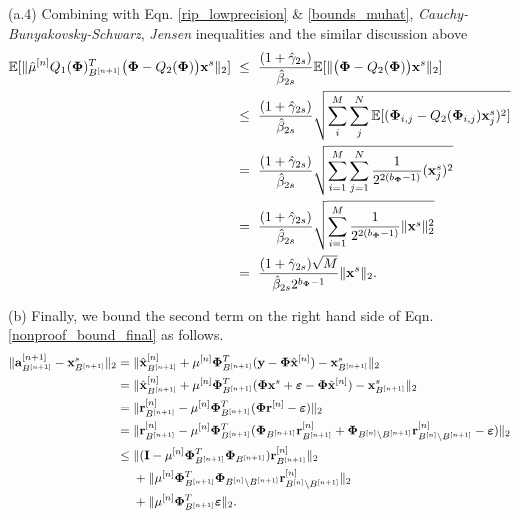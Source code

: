 \documentclass[aoas,preprint]{imsart}
\numberwithin{equation}{section}
\theoremstyle{plain}
\begin{document}
{(a.4) Combining with Eqn. \ref{rip_lowprecision} \& \ref{bounds_muhat}, {\it Cauchy-Bunyakovsky-Schwarz}, {\it Jensen} inequalities and the similar discussion above
\begin{equation}\label{forth_term_main_theorem}
\begin{split}
    \mathbb{E}[\| \hat{\mu}^{[n]}Q_1({\bf \Phi})_{B^{[n+1]}}^T\big({\bf {\bf \Phi}}-Q_2({\bf {\bf \Phi}})\big){\bf x}^s \|_2]&\ \leq \ \frac{(1+\hat{\gamma}_{2s})}{\hat{\beta}_{2s}}\mathbb{E}[\|\big({\bf {\bf \Phi}}-Q_2({\bf {\bf \Phi}})\big){\bf x}^s \|_2]\\
    &\ \leq \ \frac{(1+\hat{\gamma}_{2s})}{\hat{\beta}_{2s}}\sqrt{
    \sum_{i}^M \sum_{j}^N\mathbb{E}[({\bf \Phi}_{i, j}-Q_2({\bf \Phi}_{i, j}){\bf x}_j^s)^2]}\\
    & \ = \ \frac{(1+\hat{\gamma}_{2s})}{\hat{\beta}_{2s}}\sqrt{\sum_{i=1}^M \sum_{j=1}^N \frac{1}{2^{2(b_{\bf \Phi}-1)}}({\bf x}_j^s)^2}\\
    & \ = \ \frac{(1+\hat{\gamma}_{2s})}{\hat{\beta}_{2s}}\sqrt{\sum_{i=1}^M \frac{1}{2^{2(b_{\bf \Phi}-1)}}\|{\bf x}^s\|_2^2}\\
    & \ = \ \frac{(1+\hat{\gamma}_{2s})\sqrt{M}}{\hat{\beta}_{2s}2^{b_{\bf \Phi}-1}}\|{\bf x}^s \|_2.
\end{split}
\end{equation}

(b) Finally, we bound the second term on the right hand side of Eqn. \ref{nonproof_bound_final} as follows.
\begin{equation}\label{last_term_main_theorem}
    \begin{split}
       \|{{\bf a}}_{B^{[n+1]}}^{[n+1]} - {{\bf x}}_{B^{[n+1]}}^{s} \|_2 &= \|{\hat{\bf x}}_{B^{[n+1]}}^{[n]} + \mu^{[n]}{\bf \Phi}_{B^{[n+1]}}^T({\bf y}-{\bf \Phi} \hat{{\bf x}}^{[n]}) - {{\bf x}}_{B^{[n+1]}}^{s} \|_2\\
        &= \|{\hat{\bf x}}_{B^{[n+1]}}^{[n]} + \mu^{[n]}{\bf \Phi}_{B^{[n+1]}}^T({\bf \Phi} {\bf x}^s + \boldsymbol{\varepsilon}-{\bf \Phi} \hat{\bf x}^{[n]}) - {{\bf x}}_{B^{[n+1]}}^{s} \|_2\\
         &= \|{{\bf r}}_{B^{[n+1]}}^{[n]} - \mu^{[n]}{\bf \Phi}_{B^{[n+1]}}^T({\bf \Phi} {\bf r}^{[n]}  -\boldsymbol{\varepsilon}) \|_2\\
         &= \|{{\bf r}}_{B^{[n+1]}}^{[n]} - \mu^{[n]}{\bf \Phi}_{B^{[n+1]}}^T({\bf \Phi}_{B^{[n+1]}}{\bf r}^{[n]}_{B^{[n+1]}} + {\bf \Phi}_{B^{[n]}\backslash B^{[n+1]}}{\bf r}^{[n]}_{B^{[n]}\backslash B^{[n+1]}}  - \boldsymbol{\varepsilon}) \|_2\\
         &\leq \|({\boldsymbol{\rm I}} - \mu^{[n]}{\bf \Phi}_{B^{[n+1]}}^T{\bf \Phi}_{B^{[n+1]}}){\bf r}^{[n]}_{B^{[n+1]}}\|_2\\
         &\ \ \ \ + \|\mu^{[n]}{\bf \Phi}_{B^{[n+1]}}^T{\bf \Phi}_{B^{[n]}\backslash B^{[n+1]}}{\bf r}^{[n]}_{B^{[n]}\backslash B^{[n+1]}}\|_2\\
         &\ \ \ \ + \|\mu^{[n]}{\bf \Phi}_{B^{[n+1]}}^T\boldsymbol{\varepsilon}\|_2.
    \end{split}
\end{equation}

}
\end{document}
